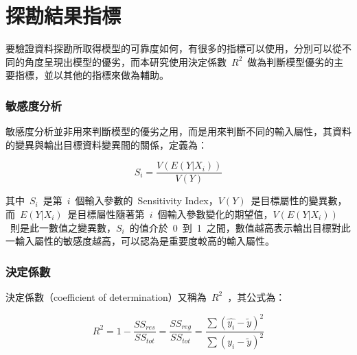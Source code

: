 \section{探勘結果指標}




要驗證資料探勘所取得模型的可靠度如何，有很多的指標可以使用，分別可以從不同的角度呈現出模型的優劣，而本研究使用決定係數~$R^2$~做為判斷模型優劣的主要指標，並以其他的指標來做為輔助。

\subsubsection{敏感度分析}

敏感度分析並非用來判斷模型的優劣之用，而是用來判斷不同的輸入屬性，其資料的變異與輸出目標資料變異間的關係，定義為：

\begin{equation}  S_i = \dfrac{V(E(Y|X_i))}{V(Y)} \label{eq:sensitivy}\end{equation} 

其中~$S_i$~是第~$i$~個輸入參數的~Sensitivity Index，$V(Y)$~是目標屬性的變異數，而~$E(Y|X_i)$~是目標屬性隨著第~$i$~個輸入參數變化的期望值，$V(E(Y|X_i))$~則是此一數值之變異數，$S_i$~的值介於~0~到~1~之間，數值越高表示輸出目標對此一輸入屬性的敏感度越高，可以認為是重要度較高的輸入屬性。


\subsubsection{決定係數}

決定係數（coefficient of determination）又稱為~$R^2$~，其公式為：

\begin{equation} R^2 = 1 - \dfrac{SS_{res}}{SS_{tot}} = \dfrac{SS_{reg}}{SS_{tot}} = \dfrac{\sum{(\hat{y_i} - \tilde{y})^2}}{\sum{(y_i - \tilde{y})^2}} \label{eq:RSQ}\end{equation} 

